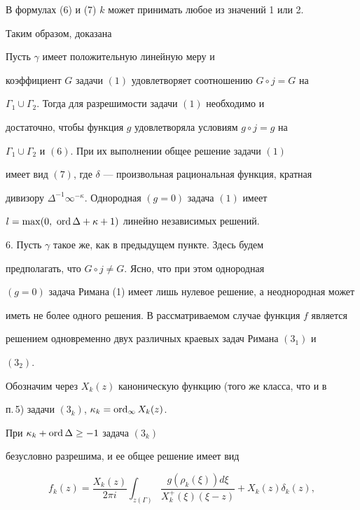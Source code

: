 В формулах (6) и (7) $k$ может принимать любое из значений 1 или 2.


Таким образом, доказана 





\begin{thm}


Пусть $\gamma$ имеет положительную линейную меру и


коэффициент $G$ задачи $(1)$ удовлетворяет соотношению $G\circ j=G$ на


$\Gamma_1\cup\Gamma_2$. Тогда для разрешимости задачи $(1)$ необходимо и


достаточно, чтобы функция $g$ удовлетворяла условиям $g\circ j=g$ на


$\Gamma_1\cup\Gamma_2$ и $(6)$. При их выполнении общее решение задачи $(1)$


имеет вид $(7)$, где $\delta$ --- произвольная рациональная функция, кратная


дивизору $\Delta^{-1}\infty^{-\kappa}$. Однородная $(g=0)$ задача $(1)$ имеет


$l=\max(0,\ \operatorname{ord}\Delta +\kappa +1)$ линейно независимых решений.


\end{thm}





6. Пусть $\gamma$ такое же, как в предыдущем пункте. Здесь будем


предполагать, что $G\circ j\ne G$. Ясно, что при этом однородная


$(g=0)$ задача Римана (1) имеет лишь нулевое решение, а неоднородная может


иметь не более одного решения. В рассматриваемом случае функция $f$ является


решением одновременно двух различных краевых задач Римана $(3_1)$ и


$(3_2)$.


Обозначим через $X_k(z)$ каноническую функцию (того же класса, что и в


п.\,5) задачи $(3_k)$, $\kappa_k=\operatorname{ord}_\infty X_k(z)$.


При $\kappa_k +\operatorname{ord}\Delta\ge -1$ задача $(3_k)$


безусловно разрешима, и ее общее решение имеет вид


\begin{equation}


f_k(z)=\frac{X_k(z)}{2\pi


i}\int_{z(\Gamma)}\frac{g(\rho_k(\xi))d\xi}{X^+_k(\xi)(\xi -z)}+


X_k(z)\delta_k(z),


\end{equation}


